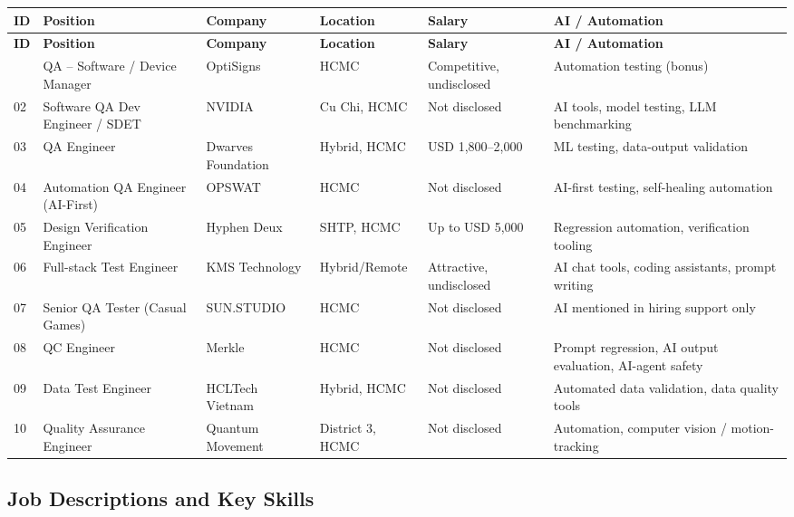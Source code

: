 \documentclass[12pt, a4paper]{article}
\begin{document}
\begin{longtable}{@{} C{0.7cm} L{3.2cm} L{2.2cm} L{2cm} L{2.5cm} L{3.2cm} @{}}
\toprule
{}
\textbf{ID} & \textbf{Position} & \textbf{Company} & \textbf{Location} & \textbf{Salary} & \textbf{AI / Automation} \\
\midrule
\endfirsthead
\toprule
{}
\textbf{ID} & \textbf{Position} & \textbf{Company} & \textbf{Location} & \textbf{Salary} & \textbf{AI / Automation} \\
\midrule
\endhead
\bottomrule
{} & QA -- Software / Device Manager & OptiSigns & HCMC & Competitive, undisclosed & Automation testing (bonus) \\
02 & Software QA Dev Engineer / SDET & NVIDIA & Cu Chi, HCMC & Not disclosed & AI tools, model testing, LLM benchmarking \\
03 & QA Engineer & Dwarves Foundation & Hybrid, HCMC & USD 1,800--2,000 & ML testing, data-output validation \\
04 & Automation QA Engineer (AI-First) & OPSWAT & HCMC & Not disclosed & AI-first testing, self-healing automation \\
05 & Design Verification Engineer & Hyphen Deux & SHTP, HCMC & Up to USD 5,000 & Regression automation, verification tooling \\
06 & Full-stack Test Engineer & KMS Technology & Hybrid/Remote & Attractive, undisclosed & AI chat tools, coding assistants, prompt writing \\
07 & Senior QA Tester (Casual Games) & SUN.STUDIO & HCMC & Not disclosed & AI mentioned in hiring support only \\
08 & QC Engineer & Merkle & HCMC & Not disclosed & Prompt regression, AI output evaluation, AI-agent safety \\
09 & Data Test Engineer & HCLTech Vietnam & Hybrid, HCMC & Not disclosed & Automated data validation, data quality tools \\
10 & Quality Assurance Engineer & Quantum Movement & District 3, HCMC & Not disclosed & Automation, computer vision / motion-tracking \\
\bottomrule
\end{longtable}

\subsection{Job Descriptions and Key Skills}
\end{document}
